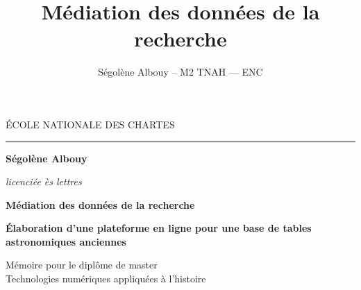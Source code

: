 \documentclass[a4paper,12pt,twoside]{book}
\author{Ségolène Albouy – M2 TNAH — ENC }
\title{Médiation des données de la recherche}
\newcommand{\g}[1]{\og#1~\fg}
\begin{document}
	\onehalfspacing 
	
	\frontmatter
	\begin{titlepage}
		\begin{center}
			
			\bigskip
			
			\begin{large}
				ÉCOLE NATIONALE DES CHARTES
			\end{large}
			\begin{center}\rule{2cm}{0.02cm}\end{center}
			
			\bigskip
			\bigskip
			\bigskip
			\begin{Large}
				\textbf{Ségolène Albouy}\\
			\end{Large}
			\begin{normalsize} \textit{licenciée ès lettres}\\
			\end{normalsize}
			
			\bigskip
			\bigskip
			\bigskip
			
			\begin{Huge}
				\textbf{Médiation des données de la recherche}\\
			\end{Huge}
			\bigskip
			\bigskip
			\begin{LARGE}
				\textbf{Élaboration d’une plateforme en ligne pour une base de tables astronomiques anciennes}\\
			\end{LARGE}
			
			\bigskip
			\bigskip
			\bigskip
			\begin{large}
			\end{large}
			\vfill
			
			\begin{large}
				Mémoire 
				pour le diplôme de master \\
				\g{Technologies numériques appliquées à l'histoire} \\
			\end{large}
			
		\end{center}
	\end{titlepage}
	
	\thispagestyle{empty}	
	\cleardoublepage
	
\end{document}
